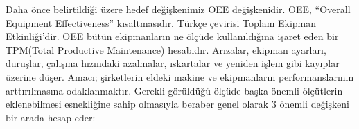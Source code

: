 \documentclass[12pt,twoside]{deuthesis}
\newenvironment{Shaded}{\begin{snugshade}}{\end{snugshade}}
\newcommand{\DecValTok}[1]{\textcolor[rgb]{0.00,0.00,0.81}{#1}}
\newcommand{\KeywordTok}[1]{\textcolor[rgb]{0.13,0.29,0.53}{\textbf{#1}}}
\newcommand{\NormalTok}[1]{#1}
\newcommand{\OperatorTok}[1]{\textcolor[rgb]{0.81,0.36,0.00}{\textbf{#1}}}
\begin{document}
\begin{Shaded}
\end{Shaded}
Daha önce belirtildiği üzere hedef değişkenimiz OEE değişkenidir. OEE, ``Overall Equipment Effectiveness'' kısaltmasıdır. Türkçe çevirisi Toplam Ekipman Etkinliği'dir. OEE bütün ekipmanların ne ölçüde kullanıldığına işaret eden bir TPM(Total Productive Maintenance) hesabıdır. Arızalar, ekipman ayarları, duruşlar, çalışma hızındaki azalmalar, ıskartalar ve yeniden işlem gibi kayıplar üzerine düşer. Amacı; şirketlerin eldeki makine ve ekipmanların performanslarının arttırılmasına odaklanmaktır. Gerekli görüldüğü ölçüde başka önemli ölçütlerin eklenebilmesi esnekliğine sahip olmasıyla beraber genel olarak 3 önemli değişkeni bir arada hesap eder:

~
\end{document}
